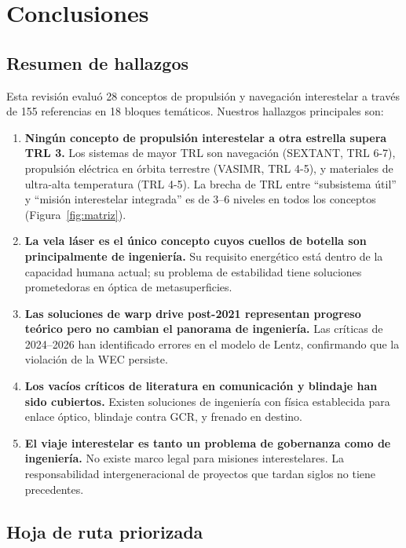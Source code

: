 \documentclass[11pt,a4paper,onecolumn]{article}
\begin{document}
\section{Conclusiones}

\subsection{Resumen de hallazgos}

Esta revisión evaluó 28 conceptos de propulsión y navegación interestelar a través de 155 referencias en 18 bloques temáticos. Nuestros hallazgos principales son:

\begin{enumerate}
  \item \textbf{Ningún concepto de propulsión interestelar a otra estrella supera TRL 3.} Los sistemas de mayor TRL son navegación (SEXTANT, TRL 6-7), propulsión eléctrica en órbita terrestre (VASIMR, TRL 4-5), y materiales de ultra-alta temperatura (TRL 4-5). La brecha de TRL entre ``subsistema útil'' y ``misión interestelar integrada'' es de 3--6 niveles en todos los conceptos (Figura~\ref{fig:matriz}).
  \item \textbf{La vela láser es el único concepto cuyos cuellos de botella son principalmente de ingeniería.} Su requisito energético está dentro de la capacidad humana actual; su problema de estabilidad tiene soluciones prometedoras en óptica de metasuperficies.
  \item \textbf{Las soluciones de warp drive post-2021 representan progreso teórico pero no cambian el panorama de ingeniería.} Las críticas de 2024--2026 han identificado errores en el modelo de Lentz, confirmando que la violación de la WEC persiste.
  \item \textbf{Los vacíos críticos de literatura en comunicación y blindaje han sido cubiertos.} Existen soluciones de ingeniería con física establecida para enlace óptico, blindaje contra GCR, y frenado en destino.
  \item \textbf{El viaje interestelar es tanto un problema de gobernanza como de ingeniería.} No existe marco legal para misiones interestelares. La responsabilidad intergeneracional de proyectos que tardan siglos no tiene precedentes.
\end{enumerate}

\subsection{Hoja de ruta priorizada}
\end{document}

